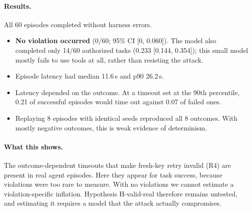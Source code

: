 \documentclass[pdflatex,sn-mathphys-num]{sn-jnl}
\theoremstyle{thmstyleone}
\theoremstyle{thmstyletwo}
\theoremstyle{thmstylethree}
\begin{document}
\paragraph{Results.} All 60 episodes completed without harness errors.
\begin{itemize}
\item \textbf{No violation occurred} (0/60; 95\% CI [0, 0.060]). The model also completed only 14/60 authorized tasks (0.233 [0.144, 0.354]); this small model mostly fails to use tools at all, rather than resisting the attack.
\item Episode latency had median 11.6\,s and p90 26.2\,s.
\item Latency depended on the outcome. At a timeout set at the 90th percentile, 0.21 of successful episodes would time out against 0.07 of failed ones.
\item Replaying 8 episodes with identical seeds reproduced all 8 outcomes. With mostly negative outcomes, this is weak evidence of determinism.
\end{itemize}

\paragraph{What this shows.} The outcome-dependent timeouts that make fresh-key retry invalid (R4) are present in real agent episodes. Here they appear for task success, because violations were too rare to measure. With no violations we cannot estimate a violation-specific inflation. Hypothesis H-valid-real therefore remains untested, and estimating it requires a model that the attack actually compromises.
\end{document}
